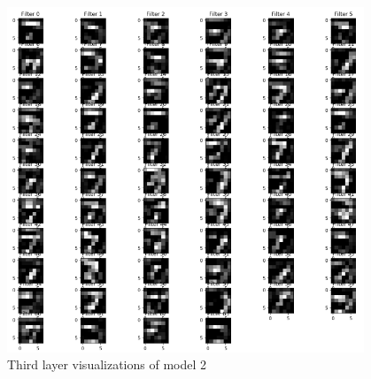 \begin{figure}[h]
    \centering
    \includegraphics[width=0.95\textwidth]{thesis_template/images/73.png}
    \caption{\small Third layer visualizations of model 2}
    \label{}
    \end{figure}
 
